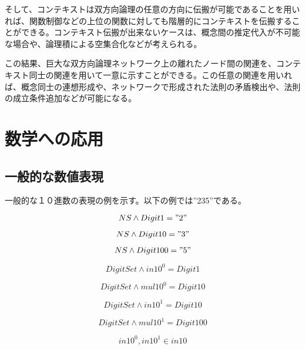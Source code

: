 \documentclass[12pt]{article}
\begin{document}
そして、コンテキストは双方向論理の任意の方向に伝搬が可能であることを用いれば、関数制御などの上位の関数に対しても階層的にコンテキストを伝搬することができる。コンテキスト伝搬が出来ないケースは、概念間の推定代入が不可能な場合や、論理積による空集合化などが考えられる。

この結果、巨大な双方向論理ネットワーク上の離れたノード間の関連を、コンテキスト同士の関連を用いて一意に示すことができる。この任意の関連を用いれば、概念同士の連想形成や、ネットワークで形成された法則の矛盾検出や、法則の成立条件追加などが可能になる。

\clearpage
\section{数学への応用}\label{ux6570ux5b66ux3078ux306eux5fdcux7528}

\subsection{一般的な数値表現}\label{ux4e00ux822cux7684ux306aux6570ux5024ux8868ux73fe}

一般的な１０進数の表現の例を示す。以下の例では''235''である。

\begin{equation} NS \wedge Digit1 = "2"\end{equation}

\begin{equation} NS \wedge Digit10 = "3"\end{equation}

\begin{equation} NS \wedge Digit100 = "5"\end{equation}

\begin{equation} DigitSet \wedge in10^0 = Digit1\end{equation}

\begin{equation} DigitSet \wedge mul10^0 = Digit10\end{equation}

\begin{equation} DigitSet \wedge in10^1 = Digit10\end{equation}

\begin{equation} DigitSet \wedge mul10^1 = Digit100\end{equation}

\begin{equation} in10^0,in10^1 \in in10 \end{equation}
\end{document}
